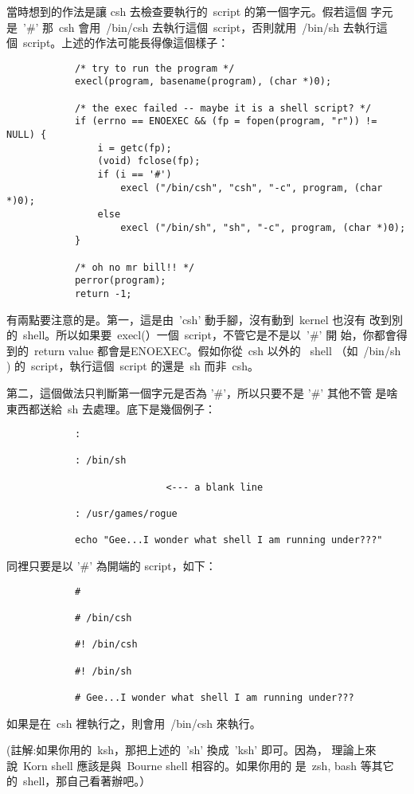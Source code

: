 \documentclass{article}
\begin{document}
\begin{CJK*}{Bg5}{ming}
	當時想到的作法是讓 csh 去檢查要執行的~script 的第一個字元。假若這個
	字元是~'\#' 那~csh 會用~/bin/csh 去執行這個~script，否則就用~/bin/sh 
        去執行這個~script。上述的作法可能長得像這個樣子：
\small
\begin{verbatim}
	        /* try to run the program */
	        execl(program, basename(program), (char *)0);

	        /* the exec failed -- maybe it is a shell script? */
	        if (errno == ENOEXEC && (fp = fopen(program, "r")) != NULL) {
        	    i = getc(fp);
	            (void) fclose(fp);
	            if (i == '#')
	                execl ("/bin/csh", "csh", "-c", program, (char *)0);
	            else
        	        execl ("/bin/sh", "sh", "-c", program, (char *)0);
	        }

	        /* oh no mr bill!! */
	        perror(program);
	        return -1;
\end{verbatim}
\normalsize
	有兩點要注意的是。第一，這是由~'csh' 動手腳，沒有動到~kernel 也沒有
	改到別的~shell。所以如果要~execl(）一個~script，不管它是不是以~'\#' 開
	始，你都會得到的~return value 都會是ENOEXEC。假如你從~csh 以外的 
	~shell （如~/bin/sh ) 的~script，執行這個~script 的還是~sh 而非~csh。

	第二，這個做法只判斷第一個字元是否為 '\#'，所以只要不是 '\#' 其他不管
	是啥東西都送給~sh 去處理。底下是幾個例子：
\begin{verbatim}
	        :

	        : /bin/sh

	                        <--- a blank line

	        : /usr/games/rogue

	        echo "Gee...I wonder what shell I am running under???"
\end{verbatim}

	同裡只要是以 '\#' 為開端的 script，如下：
\begin{verbatim}
	        #

	        # /bin/csh

	        #! /bin/csh

	        #! /bin/sh

	        # Gee...I wonder what shell I am running under???
\end{verbatim}
	如果是在~csh 裡執行之，則會用~/bin/csh 來執行。

	(註解:如果你用的~ksh，那把上述的~'sh' 換成~'ksh' 即可。因為，
	理論上來說~Korn shell 應該是與~Bourne shell 相容的。如果你用的
	是~zsh, bash 等其它的~shell，那自己看著辦吧。）


\end{CJK*}
\end{document}
